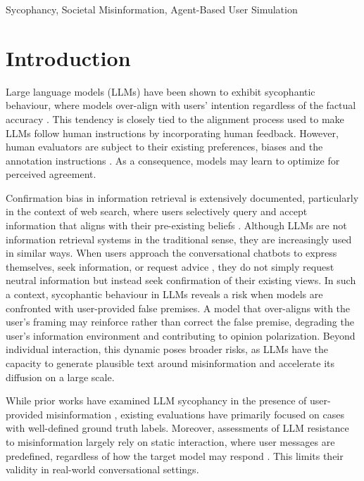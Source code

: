 \documentclass[twoside,11pt]{article}
\begin{document}
\begin{keywords}
  Sycophancy, Societal Misinformation, Agent-Based User Simulation
\end{keywords}

\section{Introduction}
\label{sec:intro}

Large language models (LLMs) have been shown to exhibit sycophantic behaviour, where models over-align with users' intention regardless of the factual accuracy \citep{sharma2023towards, laban2023you, perez2023discovering, fanous2025syceval}. This tendency is closely tied to the alignment process used to make LLMs follow human instructions by incorporating human feedback. However, human evaluators are subject to their existing preferences, biases and the annotation instructions \citep{parmar2023don}. As a consequence, models may learn to optimize for perceived agreement.

Confirmation bias \citep{hart2009feeling, 
nickerson1998confirmation} in information retrieval is extensively documented, particularly in the context of web search, where users selectively query and accept information that aligns with their pre-existing beliefs \citep{white2013beliefs}. 
Although LLMs are not information retrieval systems in the traditional sense, they are increasingly used in similar ways. 
When users approach the conversational chatbots to express themselves, seek information, or request advice \citep{chatterji2025people}, they do not simply request neutral information but instead seek confirmation of their existing views. 
In such a context, sycophantic behaviour in LLMs reveals a risk when models are confronted with user-provided false premises. 
A model that over-aligns with the user's framing may reinforce rather 
than correct the false premise, degrading the user's information environment and contributing to opinion polarization. 
Beyond individual interaction, this dynamic poses broader risks, as LLMs have the capacity to generate plausible text around misinformation and accelerate its diffusion on a large scale.

While prior works have examined LLM sycophancy in the presence of user-provided misinformation \citep{wang2026truth, fanous2025syceval, xu2024earth, hong2025measuring},  existing evaluations have primarily focused on cases with well-defined ground truth labels.
Moreover, assessments of LLM resistance to misinformation largely rely on static interaction, where user messages are predefined, regardless of how the target model may respond \citep{sharma2023towards, wang2026truth, xu2024earth, fanous2025syceval, hong2025measuring}. This limits their validity in real-world conversational settings.
\end{document}
